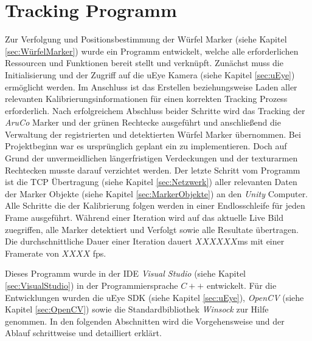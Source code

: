 \section{Tracking Programm} \label{sec:Tracking}
Zur Verfolgung und Positionsbestimmung der Würfel Marker (siehe Kapitel \ref{sec:WürfelMarker}) wurde ein Programm entwickelt, welche alle erforderlichen Ressourcen und Funktionen bereit stellt und verknüpft. Zunächst muss die Initialisierung und der Zugriff auf die uEye Kamera (siehe Kapitel \ref{sec:uEye}) ermöglicht werden. Im Anschluss ist das Erstellen beziehungsweise Laden aller relevanten Kalibrierungsinformationen für einen korrekten Tracking Prozess erforderlich. Nach erfolgreichem Abschluss beider Schritte wird das Tracking der \textit{AruCo} Marker und der grünen Rechtecke ausgeführt und anschließend die Verwaltung der registrierten und detektierten Würfel Marker übernommen. Bei Projektbeginn war es ursprünglich geplant ein  zu implementieren. Doch auf Grund der unvermeidlichen längerfristigen Verdeckungen und der texturarmen Rechtecken musste darauf verzichtet werden.
Der letzte Schritt vom Programm ist die TCP Übertragung (siehe Kapitel \ref{sec:Netzwerk}) aller relevanten Daten der Marker Objekte (siehe Kapitel \ref{sec:MarkerObjekte}) an den \textit{Unity} Computer. Alle Schritte die der Kalibrierung folgen werden in einer Endlosschleife für jeden Frame ausgeführt. Während einer Iteration wird auf das aktuelle Live Bild zuegriffen, alle Marker detektiert und Verfolgt sowie alle Resultate übertragen. Die durchschnittliche Dauer einer Iteration dauert $XXXXXX$ms mit einer Framerate von $XXXX$ fps. 

Dieses Programm wurde in der IDE \textit{Visual Studio} (siehe Kapitel \ref{sec:VisualStudio}) in der Programmiersprache $C++$ entwickelt. Für die Entwicklungen wurden die uEye SDK (siehe Kapitel \ref{sec:uEye}), \textit{OpenCV} (siehe Kapitel \ref{sec:OpenCV}) sowie die Standardbibliothek \textit{Winsock} zur Hilfe genommen. In den folgenden Abschnitten wird die Vorgehensweise und der Ablauf schrittweise und detailliert erklärt.

